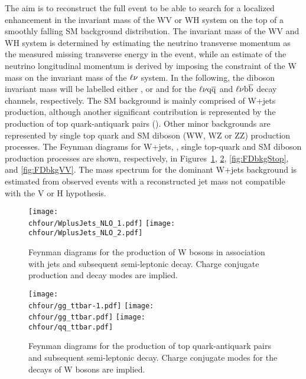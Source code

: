 The aim is to reconstruct the full event to be able to search for a localized enhancement in the invariant mass of the WV or WH system on the top of a smoothly falling SM background distribution.
The invariant mass of the WV and WH system is determined by estimating the neutrino transverse momentum as the measured missing transverse energy in the event,
while an estimate of the neutrino longitudinal momentum is derived by imposing the constraint of the W mass on the invariant mass of the $\ell\nu$ system.
In the following, the diboson invariant mass will be labelled either \mlvj, or \mWV and \mWH for the $\ell\nu\mathrm{q}\overline{\mathrm{q}}$ and $\ell\nu{\mathrm{b}\overline{\mathrm{b}}}$ decay channels, respectively.
The SM background is mainly comprised of W+jets production, although another significant contribution is represented by the production of top quark-antiquark pairs (\ttbar).
Other minor backgrounds are represented by single top quark and SM diboson (WW, WZ or ZZ) production processes.
The Feynman diagrams for W+jets, \ttbar, single top-quark and SM diboson production processes are shown, respectively, in Figures~\ref{fig:FDbkgWJets}, \ref{fig:FDbkgttbar}, \ref{fig:FDbkgStop}, and \ref{fig:FDbkgVV}.
The mass spectrum for the dominant W+jets background is estimated from observed events with a reconstructed jet mass not compatible with the V or H hypothesis.\\ 

\begin{figure}[!htb]
\centering
\texttt{[image: \\chfour/WplusJets\_NLO\_1.pdf]}
\texttt{[image: \\chfour/WplusJets\_NLO\_2.pdf]}
\caption{Feynman diagrams for the production of W bosons in association with jets and subsequent semi-leptonic decay. Charge conjugate production and decay modes are implied.}
\label{fig:FDbkgWJets}
\end{figure}

\begin{figure}[!htb]
\centering
\texttt{[image: \\chfour/gg\_ttbar-1.pdf]}
\texttt{[image: \\chfour/gg\_ttbar.pdf]}
\texttt{[image: \\chfour/qq\_ttbar.pdf]}
\caption{Feynman diagrams for the production of top quark-antiquark pairs and subsequent semi-leptonic decay. Charge conjugate modes for the decays of W bosons are implied.}
\label{fig:FDbkgttbar}
\end{figure}

